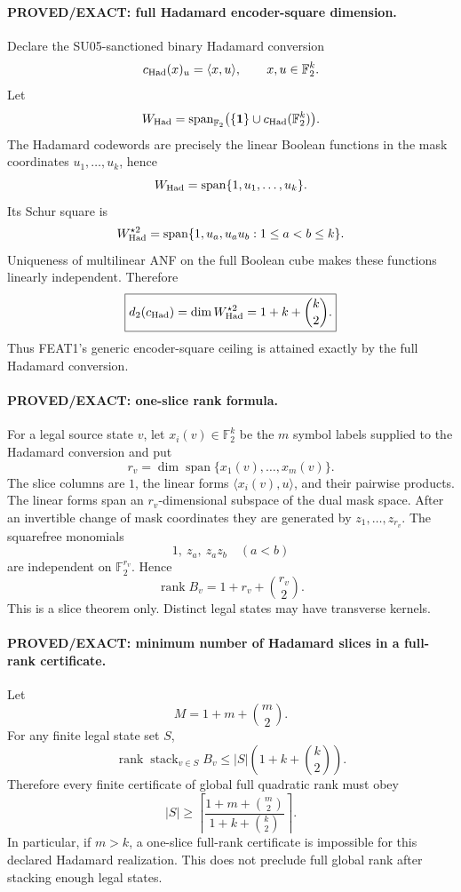 \documentclass[11pt]{article}
\begin{document}
\paragraph{PROVED/EXACT: full Hadamard encoder-square dimension.}
Declare the SU05-sanctioned binary Hadamard conversion
\[
c_{\rm Had}(x)_u=\langle x,u\rangle,\qquad x,u\in\mathbb F_2^k.
\]
Let
\[
W_{\rm Had}=\operatorname{span}_{\mathbb F_2}\bigl(\{\mathbf1\}\cup c_{\rm Had}(\mathbb F_2^k)\bigr).
\]
The Hadamard codewords are precisely the linear Boolean functions in the mask coordinates \(u_1,\ldots,u_k\), hence
\[
W_{\rm Had}=\operatorname{span}\{1,u_1,\ldots,u_k\}.
\]
Its Schur square is
\[
W_{\rm Had}^{\star2}
=\operatorname{span}\{1,u_a,u_au_b:1\le a<b\le k\}.
\]
Uniqueness of multilinear ANF on the full Boolean cube makes these functions linearly independent. Therefore
\[
\boxed{d_2(c_{\rm Had})=\dim W_{\rm Had}^{\star2}
=1+k+\binom{k}{2}.}
\]
Thus FEAT1's generic encoder-square ceiling is attained exactly by the full Hadamard conversion.

\paragraph{PROVED/EXACT: one-slice rank formula.}
For a legal source state \(v\), let \(x_i(v)\in\mathbb F_2^k\) be the \(m\) symbol labels supplied to the Hadamard conversion and put
\[
r_v=\dim\operatorname{span}\{x_1(v),\ldots,x_m(v)\}.
\]
The slice columns are \(1\), the linear forms \(\langle x_i(v),u\rangle\), and their pairwise products. The linear forms span an \(r_v\)-dimensional subspace of the dual mask space. After an invertible change of mask coordinates they are generated by \(z_1,\ldots,z_{r_v}\). The squarefree monomials
\[
1,\ z_a,\ z_az_b\quad(a<b)
\]
are independent on \(\mathbb F_2^{r_v}\). Hence
\[
\boxed{\operatorname{rank}B_v=1+r_v+\binom{r_v}{2}.}
\]
This is a slice theorem only. Distinct legal states may have transverse kernels.

\paragraph{PROVED/EXACT: minimum number of Hadamard slices in a full-rank certificate.}
Let
\[
M=1+m+\binom m2.
\]
For any finite legal state set \(S\),
\[
\operatorname{rank}\operatorname{stack}_{v\in S}B_v
\le |S|\left(1+k+\binom k2\right).
\]
Therefore every finite certificate of global full quadratic rank must obey
\[
\boxed{|S|\ge
\left\lceil
\frac{1+m+\binom m2}{1+k+\binom k2}
\right\rceil.}
\]
In particular, if \(m>k\), a one-slice full-rank certificate is impossible for this declared Hadamard realization. This does not preclude full global rank after stacking enough legal states.
\end{document}
